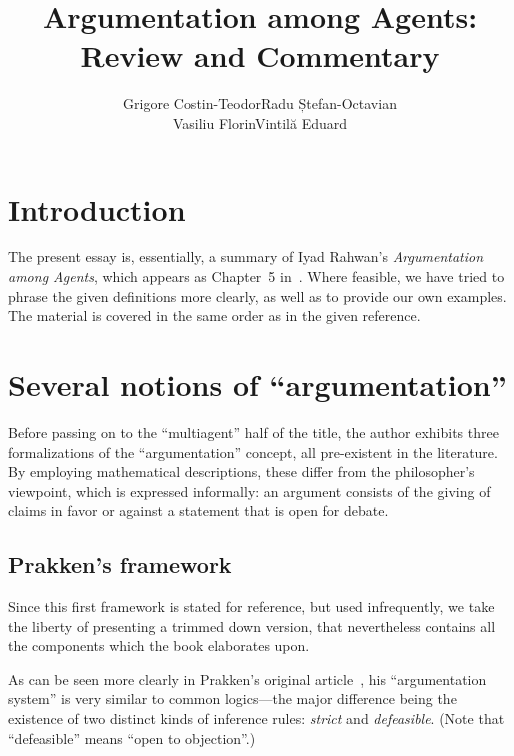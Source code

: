 \documentclass[12pt, a4paper]{article}
\title{Argumentation among Agents:\\Review and Commentary}
\author{Grigore Costin-Teodor\quad Radu Ștefan-Octavian\\Vasiliu Florin\quad Vintilă Eduard}
\date{}
\begin{document}
\maketitle

\section{Introduction}

The present essay is, essentially, a summary of Iyad Rahwan's \emph{Argumentation among Agents}, which appears as Chapter~5 in~\cite{weiss}. Where feasible, we have tried to phrase the given definitions more clearly, as well as to provide our own examples. The material is covered in the same order as in the given reference.

\section{Several notions of ``argumentation''}

Before passing on to the ``multiagent'' half of the title, the author exhibits three formalizations of the ``argumentation'' concept, all pre-existent in the literature. By employing mathematical descriptions, these differ from the philosopher's viewpoint, which is expressed informally: an argument consists of the giving of claims in favor or against a statement that is open for debate.

\subsection{Prakken's framework}

Since this first framework is stated for reference, but used infrequently, we take the liberty of presenting a trimmed down version, that nevertheless contains all the components which the book elaborates upon.

As can be seen more clearly in Prakken's original article~\cite{prakken}, his ``argumentation system'' is very similar to common logics---the major difference being the existence of two distinct kinds of inference rules: \emph{strict} and \emph{defeasible}. (Note that ``defeasible'' means ``open to objection''.)
\end{document}
